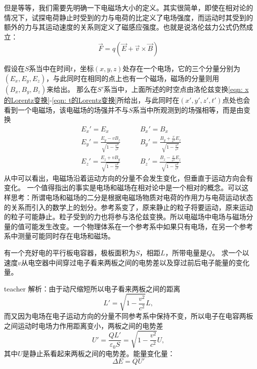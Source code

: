 但是等等，我们需要先明确一下电磁场大小的定义。其实很简单，即使在相对论的情况下，试探电荷静止时受到的力与电荷的比定义了电场强度，而运动时其受到的额外的力与其运动速度的关系则定义了磁感应强度。也就是说洛伦兹力公式仍然成立：
\[\vec{F}=q(\vec{E}+\vec{v}\times\vec{B})\]

假设在$S$系当中在时间$t$，坐标$(x,y,z)$处存在一个电场，它的三个分量分别为$(E_x,E_y,E_z)$，与此同时在相同的点上也有一个磁场，磁场的分量则用$(B_x,B_y,B_z)$来给出。
那么在$S'$系当中，上面所述的时空点由洛伦兹变换\ref{eqn: x的Lorentz变换}-\ref{eqn: t的Lorentz变换}所给出，与此同时在$(x',y',z',t')$点处也会看到一个电磁场，该电磁场的场强并不与$S$系当中所观测到的场强相等，而是由变换
\begin{eqnarray}\label{eqn: 电磁场的Lorentz变换}
&E_x'=E_x \qquad &B_x'=B_x\\
&E_y'=\frac{E_y-vB_z}{\sqrt{1-\frac{v^2}{c^2}}}\qquad &B_y'=\frac{B_y+\frac{v}{c^2}E_z}{\sqrt{1-\frac{v^2}{c^2}}}\\
&E_z'=\frac{E_z+vB_y}{\sqrt{1-\frac{v^2}{c^2}}}\qquad &B_z'=\frac{B_z-\frac{v}{c^2}E_z}{\sqrt{1-\frac{v^2}{c^2}}}
\end{eqnarray}
从中可以看出，电磁场沿着运动方向的分量不会发生变化，但垂直于运动方向会有变化。
一个值得指出的事实是电场和磁场在相对论中是一个相对的概念。可以这样思考：所谓电场和磁场的二分是根据电磁场物质对电荷的作用力与电荷运动状态的关系而引入的数学上的划分。参考系变了，原来静止的粒子将要运动，原来运动的粒子可能静止。粒子受到的力也将参与洛伦兹变换。所以电磁场中电场与磁场分量的值可能发生改变。一个物理体系在一个参考系中如果只有电场，在另一个参考系中测量可能同时存在电场和磁场。

\begin{example}
有一个充好电的平行板电容器，极板面积为$S$，相距$L$，所带电量是$Q$。
求一个以速度$v$从电空器中间穿过电子看来两板之间的电势差以及穿过前后电子能量的变化量。
\begin{taggedblock}{teacher}
\noindent
解析：由于动尺缩短所以电子看来两板之间的距离
\[
L' = \sqrt{1- \frac{v^2}{c^2}}L,
\]
而又因为电场在电子运动方向的分量不同参考系中保持不变，所以电子在电容两板之间运动时电场力作用距离变小，两板之间的电势差
\[
U' = \frac{QL'}{ \varepsilon_0 S} = \sqrt{1- \frac{v^2}{c^2}}U,
\]
其中$U$是静止系看起来两板之间的电势差。能量变化量：
\[\Delta E=QU'\]
\end{taggedblock}
\end{example}



